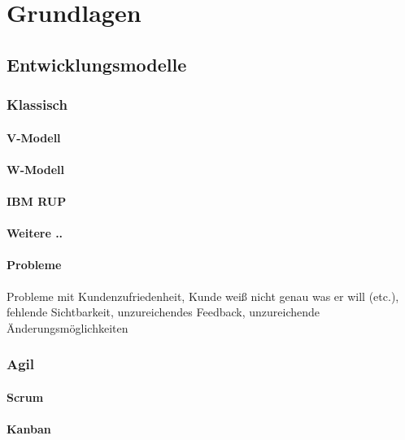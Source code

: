 \chapter{Grundlagen}

\section{Entwicklungsmodelle} %

\subsection{Klassisch}

\subsubsection{V-Modell}

\subsubsection{W-Modell}

\subsubsection{IBM RUP}

\subsubsection{Weitere ..}

\subsubsection{Probleme}

Probleme mit Kundenzufriedenheit, Kunde weiß nicht genau was er will (etc.),
fehlende Sichtbarkeit, unzureichendes Feedback, unzureichende Änderungsmöglichkeiten

\subsection{Agil}

\subsubsection{Scrum}

\subsubsection{Kanban}


